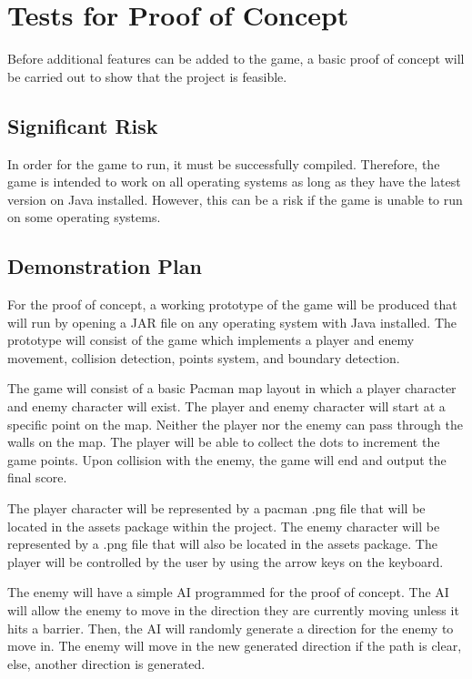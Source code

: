 \documentclass[12pt, titlepage]{article}
\begin{document}
\section{Tests for Proof of Concept}

Before additional features can be added to the game, a basic proof of concept will be carried out to show that the project is feasible. 

\subsection{Significant Risk}

In order for the game to run, it must be successfully compiled. Therefore, the game is intended to work on all operating systems as long as they have the latest version on Java installed. However, this can be a risk if the game is unable to run on some operating systems.

\subsection{Demonstration Plan}

For the proof of concept, a working prototype of the game will be produced that will run by opening a JAR file on any operating system with Java installed. The prototype will consist of the game which implements a player and enemy movement, collision detection, points system, and boundary detection.

	The game will consist of a basic Pacman map layout in which a player character and enemy character will exist. The player and enemy character will start at a specific point on the map. Neither the player nor the enemy can pass through the walls on the map. The player will be able to collect the dots to increment the game points. Upon collision with the enemy, the game will end and output the final score.

	The player character will be represented by a pacman .png file that will be located in the assets package within the project. The enemy character will be represented by a .png file that will also be located in the assets package. The player will be controlled by the user by using the arrow keys on the keyboard.

	The enemy will have a simple AI programmed for the proof of concept. The AI will allow the enemy to move in the direction they are currently moving unless it hits a barrier. Then, the AI will randomly generate a direction for the enemy to move in. The enemy will move in the new generated direction if the path is clear, else, another direction is generated.
		
\end{document}
